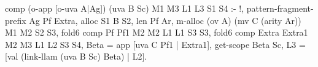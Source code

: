 \begin{elpicode}
  comp (o-app [o-uva A|Ag]) (uva B Sc) M1 M3 L1 L3 S1 S4 :- !,
    pattern-fragment-prefix Ag Pf Extra, alloc S1 B S2,
    len Pf Ar, m-alloc (ov A) (mv C (arity Ar)) M1 M2 S2 S3,
    fold6 comp Pf    Pf1    M2 M2 L1 L1 S3 S3,
    fold6 comp Extra Extra1 M2 M3 L1 L2 S3 S4,
    Beta = app [uva C Pf1 | Extra1],
    get-scope Beta Sc, 
    L3 = [val (link-llam (uva B Sc) Beta) | L2].
\end{elpicode}
